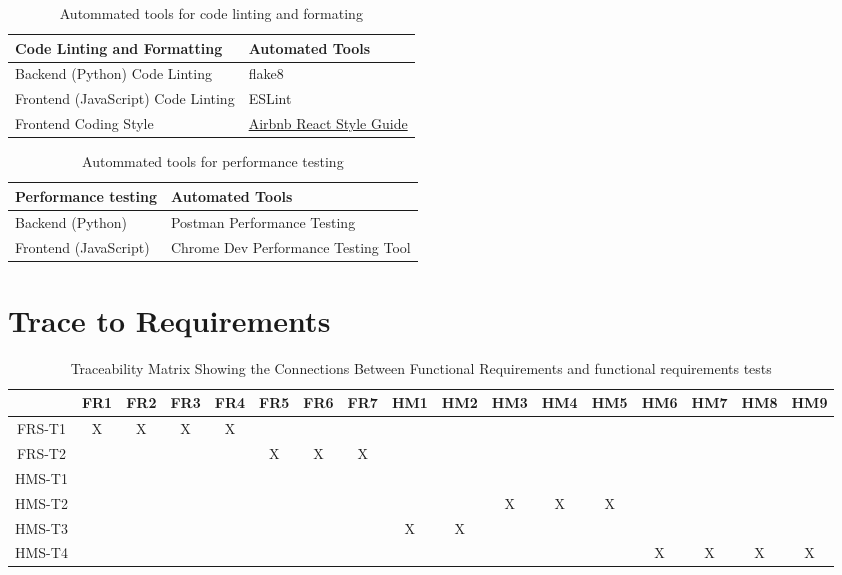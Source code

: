 \documentclass[12pt, titlepage]{article}
\begin{document}
\begin{table}[!h]
    \centering
    \begin{tabular}{p{}|p{}}
    \hline
        \textbf{Code Linting and Formatting} & \textbf{Automated Tools} \\ \hline
        Backend (Python) Code Linting & flake8 \\ \hline
        Frontend (JavaScript) Code Linting & ESLint \\ \hline
        Frontend Coding Style & \href{https://airbnb.io/javascript/react/}{Airbnb React Style Guide} \\ \hline
    \end{tabular}
    \caption{Autommated tools for code linting and formating}
\end{table}

\begin{table}[!h]
    \centering
    \begin{tabular}{p{}|p{}}
    \hline
        \textbf{Performance testing} & \textbf{Automated Tools} \\ \hline
        Backend (Python) & Postman Performance Testing \\ \hline
        Frontend (JavaScript) & Chrome Dev Performance Testing Tool\\ \hline
    \end{tabular}
    \caption{Autommated tools for performance testing}
\end{table}	

\section{Trace to Requirements} 
\begin{landscape}
\begin{table}[h!]
\centering
\begin{tabular}{|c|c|c|c|c|c|c|c|c|c|c|c|c|c|c|c|c|}
\hline
	& FR1 & FR2 & FR3 & FR4 & FR5 & FR6 & FR7 & HM1 & HM2 & HM3 & HM4 & HM5 & HM6 & HM7 & HM8 & HM9 \\
\hline
FRS-T1        & X& X& X& X& & & & & & & & & & & & \\ \hline
FRS-T2        & & & & & X& X& X& & & & & & & & &  \\ \hline
HMS-T1        & & & & & & & & & & & & & & & & \\ \hline
HMS-T2        & & & & & & & & & & X& X& X& & & & \\ \hline
HMS-T3        & & & & & & & & X& X& & & & & & & \\ \hline
HMS-T4        & & & & & & & & & & & & & X& X& X&X \\ \hline

\end{tabular}
\caption{Traceability Matrix Showing the Connections Between Functional Requirements and functional requirements tests}
\label{Table:A_trace}
\end{table}
\end{landscape}
\end{document}
